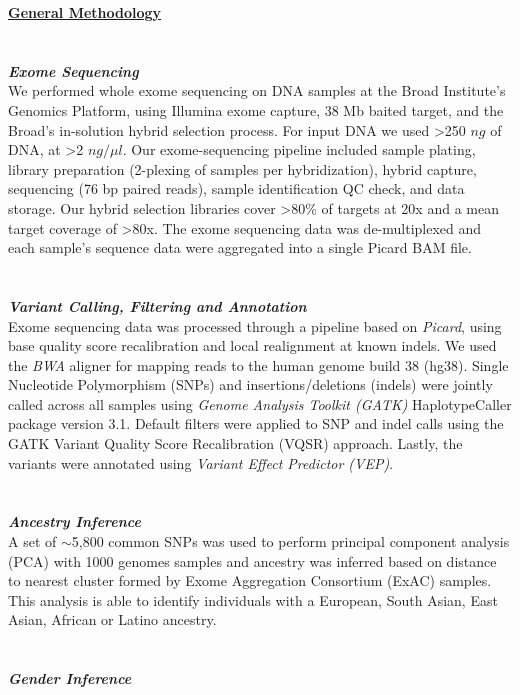 {\Large \textbf{\underline{General Methodology}}}
\\ \\ \\
{\large \textbf{\textit{Exome Sequencing}}}
\\
We performed whole exome sequencing on DNA samples at the Broad Institute's Genomics Platform, using Illumina exome capture, 38 Mb baited target, and the Broad's in-solution 
hybrid selection process. For input DNA we used \textgreater250 $ng$ of DNA, at \textgreater2 $ng/\mu l$. Our exome-sequencing pipeline included sample plating, library preparation (2-plexing of samples 
per hybridization), hybrid capture, sequencing (76 bp paired reads), sample identification QC check, and data storage. Our hybrid selection libraries cover \textgreater80\% of targets at 
20x and a mean target coverage of \textgreater80x. The exome sequencing data was de-multiplexed and each sample's sequence data were aggregated into a single Picard BAM file.
\\ \\ \\
{\large \textbf{\textit{Variant Calling, Filtering and Annotation}}}
\\
Exome sequencing data was processed through a pipeline based on \textit{Picard}, using base quality score recalibration and local 
realignment at known indels. We used the \textit{BWA} aligner for mapping reads to the human genome build 38 (hg38). Single Nucleotide Polymorphism (SNPs) 
and insertions/deletions (indels) were jointly called across all samples using \textit{Genome Analysis Toolkit (GATK)} HaplotypeCaller package version 3.1. 
Default filters were applied to SNP and indel calls using the GATK Variant Quality Score Recalibration (VQSR) approach. 
Lastly, the variants were annotated using \textit{Variant Effect Predictor (VEP)}.
\\ \\ \\
{\large \textbf{\textit{Ancestry Inference}}}
\\
A set of $\sim$5,800 common SNPs was used to perform principal component analysis (PCA) with 1000 genomes samples and ancestry was inferred based on distance to nearest 
cluster formed by Exome Aggregation Consortium (ExAC) samples. This analysis is able to identify individuals with a European, South Asian, East Asian, African or 
Latino ancestry.
\\ \\ \\
{\large \textbf{\textit{Gender Inference}}}
